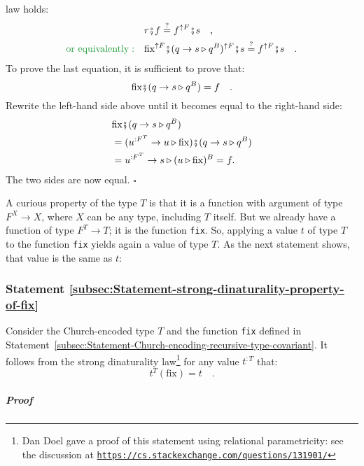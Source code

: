 law holds:
\begin{align*}
 & r\bef f\overset{?}{=}f^{\uparrow F}\bef s\quad,\\
{\color{greenunder}\text{or equivalently}:}\quad & \text{fix}^{\uparrow F}\bef(q\rightarrow s\triangleright q^{B})^{\uparrow F}\bef s\overset{?}{=}f^{\uparrow F}\bef s\quad.
\end{align*}
To prove the last equation, it is sufficient to prove that:
\[
\text{fix}\bef(q\rightarrow s\triangleright q^{B})=f\quad.
\]
Rewrite the left-hand side above until it becomes equal to the right-hand
side:
\begin{align*}
 & \text{fix}\bef(q\rightarrow s\triangleright q^{B})\\
 & =(u^{:F^{T}}\rightarrow u\triangleright\text{fix})\bef(q\rightarrow s\triangleright q^{B})\\
 & =u^{:F^{T}}\rightarrow s\triangleright(u\triangleright\text{fix})^{B}=f.
\end{align*}
The two sides are now equal. $\square$

A curious property of the type $T$ is that it is a function with
argument of type $F^{X}\rightarrow X$, where $X$ can be any type,
including $T$ itself. But we already have a function of type $F^{T}\rightarrow T$;
it is the function \lstinline!fix!. So, applying a value $t$ of
type $T$ to the function \lstinline!fix! yields again a value of
type $T$. As the next statement shows, that value is the same as
$t$:

\subsubsection{Statement \label{subsec:Statement-strong-dinaturality-property-of-fix}\ref{subsec:Statement-strong-dinaturality-property-of-fix}}

Consider the Church-encoded type $T$ and the function \lstinline!fix!
defined in Statement~\ref{subsec:Statement-Church-encoding-recursive-type-covariant}.
It follows from the strong dinaturality law\footnote{Dan Doel gave a proof of this statement using relational
parametricity: see the discussion at \texttt{\href{https://cs.stackexchange.com/questions/131901/}{https://cs.stackexchange.com/questions/131901/}}} for any value $t^{:T}$ that:
\begin{equation}
t^{T}(\text{fix})=t\quad.\label{eq:fix-unfix-property-of-T}
\end{equation}


\subparagraph{Proof}

